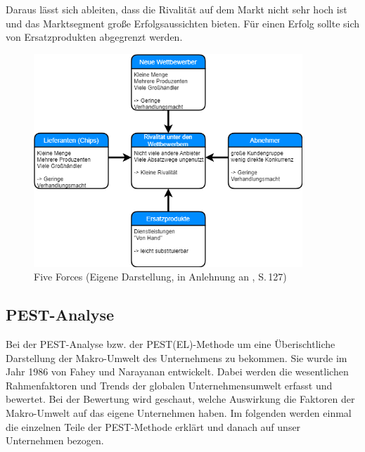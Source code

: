         \noindent
        Daraus lässt sich ableiten, dass die Rivalität auf dem Markt nicht sehr hoch ist und das Marktsegment große
        Erfolgsaussichten bieten. Für einen Erfolg sollte sich von Ersatzprodukten abgegrenzt werden.

        \begin{figure}[ht]
            \centering
            \includegraphics[width = 0.9\textwidth]{Eigene Darstellungen/Distributionswege2.png}

            \caption{Five Forces (Eigene Darstellung, in Anlehnung an \cite{Gamayanto2005}, S.\,127)}
        \end{figure}
        

        \subsection{PEST-Analyse} \label{pest}
            Bei der PEST-Analyse bzw. der PEST(EL)-Methode um eine Überischtliche Darstellung der Makro-Umwelt des Unternehmens
            zu bekommen. Sie wurde im Jahr 1986 von Fahey und Narayanan entwickelt. Dabei werden die wesentlichen Rahmenfaktoren
            und Trends der globalen Unternehmensumwelt erfasst und 
            bewertet. Bei der Bewertung wird geschaut, welche Auswirkung die Faktoren der Makro-Umwelt auf das eigene 
            Unternehmen haben. Im folgenden werden einmal die einzelnen Teile der PEST-Methode erklärt und danach auf unser 
            Unternehmen bezogen.
    
